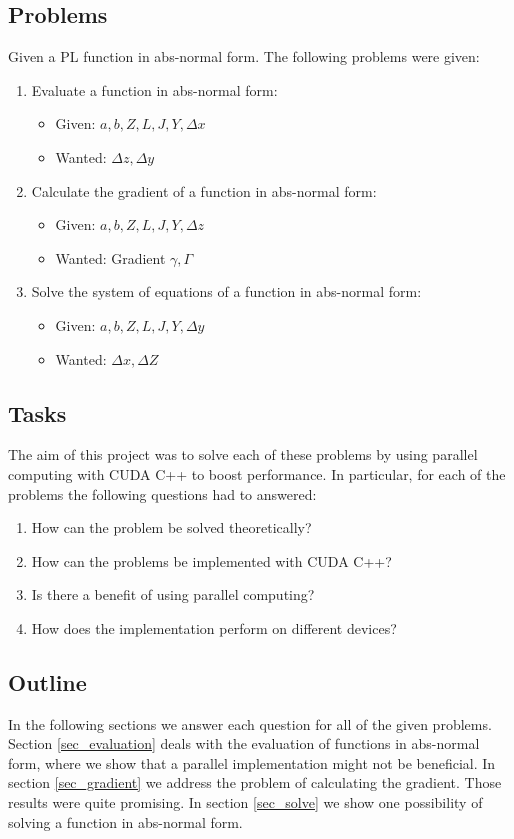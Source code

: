 \subsection{Problems}
Given a PL function in abs-normal form. The following problems were given:
\begin{enumerate}
	\item Evaluate a function in abs-normal form:
	\begin{itemize}
		\item Given: $a,b,Z,L,J,Y,\Delta x$
		\item Wanted: $\Delta z, \Delta y$
	\end{itemize}
	\item Calculate the gradient of a function in abs-normal form:
	\begin{itemize}
		\item Given: $a,b,Z,L,J,Y, \Delta z$
		\item Wanted: Gradient $\gamma, \Gamma$
	\end{itemize}
	\item Solve the system of equations of a function in abs-normal form:
	\begin{itemize}
		\item Given: $a,b,Z,L,J,Y,\Delta y$
		\item Wanted: $\Delta x, \Delta Z$
	\end{itemize}
\end{enumerate}

\subsection{Tasks}
The aim of this project was to solve each of these problems by using parallel computing with CUDA C++ to boost performance.
In particular, for each of the problems the following questions had to answered:
\begin{enumerate}[{(}I{)}]
	\item How can the problem be solved theoretically?
	\item How can the problems be implemented with CUDA C++?
	\item Is there a benefit of using parallel computing?
	\item How does the implementation perform on different devices?
\end{enumerate}

\subsection{Outline}
In the following sections we answer each question for all of the given problems.
Section \ref{sec_evaluation} deals with the evaluation of functions in abs-normal form, where we show that a parallel implementation might not be beneficial. In section \ref{sec_gradient} we address the problem of calculating the gradient. Those results were quite promising. In section \ref{sec_solve} we show one possibility of solving a function in abs-normal form.

